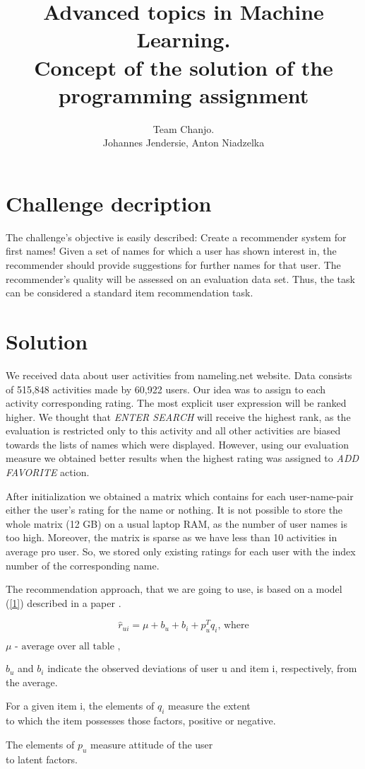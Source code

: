 \documentclass[pdftex,a4paper,11pt]{article}
\title{Advanced topics in Machine Learning. \\ Concept of the solution of the programming assignment}
\author{ Team Chanjo. \\ Johannes Jendersie, Anton Niadzelka }
\begin{document}
\maketitle

\section{Challenge decription}
The challenge’s objective is easily described: Create a recommender system for first names! Given a set of names for which a user has shown interest in, the recommender should provide suggestions for further names for that user. The recommender’s quality will be assessed on an evaluation data set. Thus, the task can be considered a standard item recommendation task.

\section{Solution}

We received data about user activities from nameling.net website. Data consists of 515,848 activities made by 60,922 users. Our idea was to assign to each activity corresponding rating. The most explicit user expression will be ranked higher. We thought that \textit{ENTER SEARCH} will receive the highest rank, as  the evaluation is restricted only to this activity and all other activities are biased towards the lists of names which were displayed. However, using our evaluation measure we obtained better results when the highest rating was assigned to \textit{ADD FAVORITE} action. 


After initialization we obtained a matrix which contains for each user-name-pair either the user's rating for the name or nothing. It is not possible to store the whole matrix (12 GB) on a usual laptop RAM, as the number of user names is too high. Moreover, the matrix is sparse as we have less than 10 activities in average pro user. So, we stored only existing ratings for each user with the index number of the corresponding name.

The recommendation approach, that we are going to use, is based on a model (\ref{1}) described in a paper \cite{2}. 

\begin{equation} \label{1} \hat{r}_{u i} = \mu + b_u + b_i + p^T _u q_i   \text{, where} \end{equation}
\begin{center} $  \mu \text{ - average over all table  ,}  $ \end{center}
\begin{center} $ b_u $ and $ b_i $ indicate the observed deviations of user u and item i, respectively, from the average.
 \end{center}
\begin{center} For a given item i, the elements of $ q_i $ measure the extent \\ to which the item possesses those factors, positive or negative. \end{center}
\begin{center} The elements of $ p_u $ measure attitude of the user \\ to latent factors. \end{center}
\end{document}
